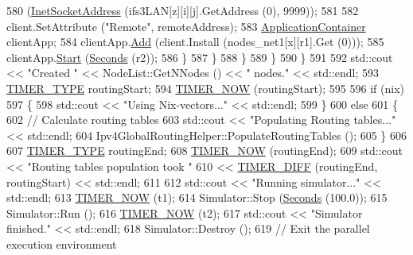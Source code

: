 \begin{DoxyCode}
580                         (\hyperlink{classns3_1_1InetSocketAddress}{InetSocketAddress} (ifs3LAN[z][i][j].GetAddress (0), 9999));
581 
582                       client.SetAttribute (\textcolor{stringliteral}{"Remote"}, remoteAddress);
583                       \hyperlink{classns3_1_1ApplicationContainer}{ApplicationContainer} clientApp;
584                       clientApp.\hyperlink{classns3_1_1ApplicationContainer_ad09ab1a1ad5849d518d5f4c262e38152}{Add} (client.Install (nodes\_net1[x][r1].Get (0)));
585                       clientApp.\hyperlink{classns3_1_1ApplicationContainer_a8eff87926507020bbe3e1390358a54a7}{Start} (\hyperlink{group__timecivil_ga33c34b816f8ff6628e33d5c8e9713b9e}{Seconds} (r2));
586                     \}
587                 \}
588             \}
589         \}
590     \}
591 
592   std::cout << \textcolor{stringliteral}{"Created "} << NodeList::GetNNodes () << \textcolor{stringliteral}{" nodes."} << std::endl;
593   \hyperlink{nms-p2p-nix-distributed_8cc_adfc7b6dfe70e564fc379bd23c8e5b488}{TIMER\_TYPE} routingStart;
594   \hyperlink{nms-p2p-nix-distributed_8cc_a4ea1f7c69e863076962d247fee766870}{TIMER\_NOW} (routingStart);
595 
596   \textcolor{keywordflow}{if} (nix)
597     \{
598       std::cout << \textcolor{stringliteral}{"Using Nix-vectors..."} << std::endl;
599     \}
600   \textcolor{keywordflow}{else}
601     \{
602       \textcolor{comment}{// Calculate routing tables}
603       std::cout << \textcolor{stringliteral}{"Populating Routing tables..."} << std::endl;
604       Ipv4GlobalRoutingHelper::PopulateRoutingTables ();
605     \}
606 
607   \hyperlink{nms-p2p-nix-distributed_8cc_adfc7b6dfe70e564fc379bd23c8e5b488}{TIMER\_TYPE} routingEnd;
608   \hyperlink{nms-p2p-nix-distributed_8cc_a4ea1f7c69e863076962d247fee766870}{TIMER\_NOW} (routingEnd);
609   std::cout << \textcolor{stringliteral}{"Routing tables population took "}
610        << \hyperlink{nms-p2p-nix-distributed_8cc_ad474bed5f9f85ea66d5cf9a9648d4a72}{TIMER\_DIFF} (routingEnd, routingStart) << std::endl;
611 
612   std::cout << \textcolor{stringliteral}{"Running simulator..."} << std::endl;
613   \hyperlink{nms-p2p-nix-distributed_8cc_a4ea1f7c69e863076962d247fee766870}{TIMER\_NOW} (t1);
614   Simulator::Stop (\hyperlink{group__timecivil_ga33c34b816f8ff6628e33d5c8e9713b9e}{Seconds} (100.0));
615   Simulator::Run ();
616   \hyperlink{nms-p2p-nix-distributed_8cc_a4ea1f7c69e863076962d247fee766870}{TIMER\_NOW} (t2);
617   std::cout << \textcolor{stringliteral}{"Simulator finished."} << std::endl;
618   Simulator::Destroy ();
619   \textcolor{comment}{// Exit the parallel execution environment}

\end{DoxyCode}
